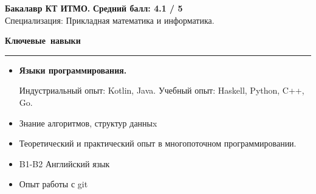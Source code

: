 \documentclass[12pt, a4paper]{report}
\begin{document}
    \textbf{Бакалавр КТ ИТМО.}
    \hfill
    \textbf{ Средний балл: 4.1 / 5} \\
    Специализация: Прикладная математика и информатика.\\


    \par\hbox{\large\textbf{Ключевые навыки}}\kern5pt\hrule\kern5pt

    \begin{itemize}

        \item \textbf{Языки программирования.}

        Индустриальный опыт: Kotlin, Java. Учебный опыт: Haskell, Python, C++, Go.

        \item Знание алгоритмов, структур данныx
        \item Теоретический и практический опыт в многопоточном программировании.
        \item B1-B2 Английский язык
        \item Опыт работы с git
    \end{itemize}
\end{document}
